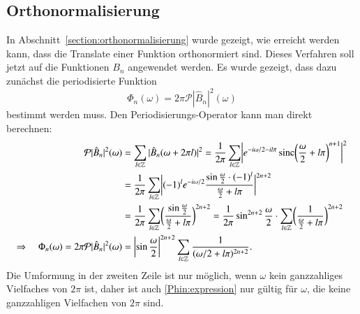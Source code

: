 \subsection{Orthonormalisierung
\label{subsection:spline-orthonormalisierung}}
In Abschnitt~\ref{section:orthonormalisierung} wurde gezeigt, wie 
erreicht werden kann, dass die Translate einer Funktion orthonormiert
sind.
Dieses Verfahren soll jetzt auf die Funktionen $B_n$ angewendet werden.
Es wurde gezeigt, dass dazu zunächst die periodisierte Funktion
\[
\Phi_n(\omega)
=
2\pi \mathcal{P}|\hat{B}_n|^2(\omega)
\]
bestimmt werden muss. 
Den Periodisierungs-Operator kann man direkt berechnen:
\begin{align}
\mathcal{P} |\hat{B}_n|^2(\omega)
&=
\sum_{l\in\mathbb Z} |\hat{B}_n(\omega + 2\pi l)|^2
=
\frac{1}{2\pi}
\sum_{l\in\mathbb Z}
\biggl|
e^{-i\omega/2 -il\pi}
\sinc\biggl(\frac{\omega}2+l\pi\biggr)^{n+1}
\biggr|^2
\notag
\\
&=
\frac{1}{2\pi}
\sum_{l\in\mathbb Z}
\biggl|
(-1)^l
e^{-i\omega/2}
\frac{\sin\frac{\omega}2 \cdot (-1)^l}{\frac{\omega}2 + l\pi}
\biggr|^{2n+2}
\notag
\\
&=
\frac{1}{2\pi}
\sum_{l\in\mathbb Z}
\biggl(
\frac{\sin\frac{\omega}2}{\frac{\omega}2 + l\pi}
\biggr)^{2n+2}
=
\frac{1}{2\pi}
\sin^{2n+2}\frac{\omega}2
\cdot
\sum_{l\in\mathbb Z}
\biggl(
\frac{1}{\frac{\omega}2 + l\pi}
\biggr)^{2n+2}
\notag
\\
\Rightarrow\quad
\Phi_n(\omega)
=
2\pi\mathcal{P}|\hat{B}_n|^2(\omega)
&=
\biggl|\sin\frac{\omega}2\biggr|^{2n+2}
\sum_{l\in\mathbb Z}
\frac{1}{(\omega/2 + l\pi)^{2n+2}}
.
\label{Phin:expression}
\end{align}
Die Umformung in der zweiten Zeile ist nur möglich, wenn $\omega$
kein ganzzahliges Vielfaches von $2\pi$ ist, daher ist auch
\eqref{Phin:expression} nur gültig für $\omega$, die keine ganzzahligen
Vielfachen von $2\pi$ sind.

